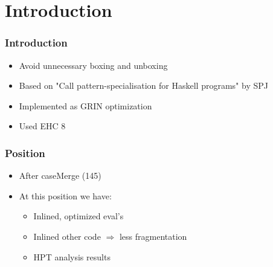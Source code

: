 \section{Introduction}

\begin{frame}
\frametitle{Introduction}

\begin{itemize}
  \item Avoid unnecessary boxing and unboxing
  \item Based on "Call pattern-specialisation for Haskell programs" by SPJ
  \item Implemented as GRIN optimization
  \item Used EHC 8
\end{itemize}

\end{frame}

\begin{frame}
\frametitle{Position}

\begin{itemize}
  \item After caseMerge (145)
  \item At this position we have:
  \begin{itemize}
    \item Inlined, optimized eval's
    \item Inlined other code $\Rightarrow$ less fragmentation
    \item HPT analysis results
  \end{itemize}
\end{itemize}

\end{frame}



